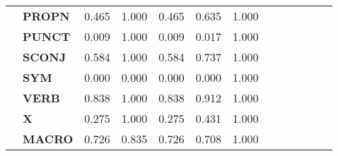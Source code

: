 \begin{longtable}{|l||l||l||l||l||l||l||l||l||l||l||l||l|}
\textbf{} & \textbf{PROPN} & 0.465 & 1.000 & 0.465 & 0.635 & 1.000 \\
\textbf{} & \textbf{PUNCT} & 0.009 & 1.000 & 0.009 & 0.017 & 1.000 \\
\textbf{} & \textbf{SCONJ} & 0.584 & 1.000 & 0.584 & 0.737 & 1.000 \\
\textbf{} & \textbf{SYM} & 0.000 & 0.000 & 0.000 & 0.000 & 1.000 \\
\textbf{} & \textbf{VERB} & 0.838 & 1.000 & 0.838 & 0.912 & 1.000 \\
\textbf{} & \textbf{X} & 0.275 & 1.000 & 0.275 & 0.431 & 1.000 \\
\textbf{} & \textbf{MACRO} & 0.726 & 0.835 & 0.726 & 0.708 & 1.000 \\
\cline{1-7}
\end{longtable}
